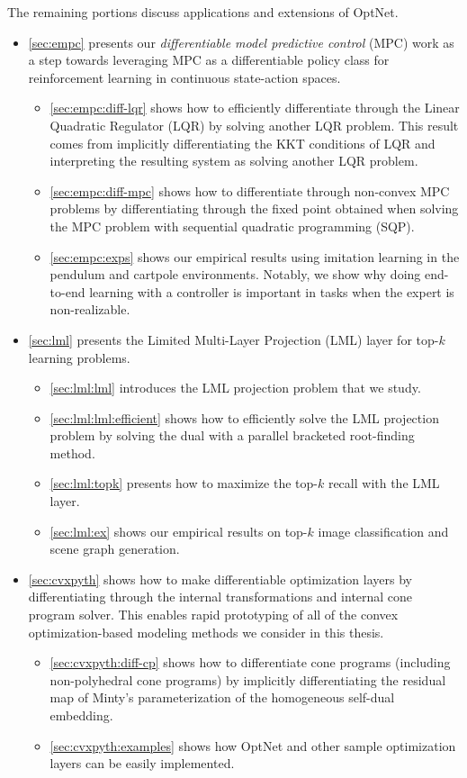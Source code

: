 \vspace{4mm}
The remaining portions discuss applications and
extensions of OptNet.
\begin{itemize}
\item \cref{sec:empc} presents our
  \emph{differentiable model predictive control} (MPC) work
  as a step towards leveraging MPC as a differentiable
  policy class for reinforcement learning in continuous
  state-action spaces.
  \begin{itemize}
  \item \cref{sec:empc:diff-lqr} shows how to efficiently
    differentiate through the Linear Quadratic Regulator (LQR)
    by solving another LQR problem.
    This result comes from implicitly differentiating the KKT
    conditions of LQR and interpreting the resulting system
    as solving another LQR problem.
  \item \cref{sec:empc:diff-mpc} shows how to differentiate
    through non-convex MPC problems by differentiating through the
    fixed point obtained when solving the MPC problem with
    sequential quadratic programming (SQP).
  \item \cref{sec:empc:exps} shows our empirical results
    using imitation learning in the pendulum and cartpole
    environments.
    Notably, we show why doing end-to-end learning with
    a controller is important in tasks when the expert
    is non-realizable.
  \end{itemize}
  \newpage
\item \cref{sec:lml} presents the Limited Multi-Layer Projection
  (LML) layer for top-$k$ learning problems.
  \begin{itemize}
  \item \cref{sec:lml:lml} introduces the LML projection problem
    that we study.
  \item \cref{sec:lml:lml:efficient} shows how to efficiently
    solve the LML projection problem by solving the dual
    with a parallel bracketed root-finding method.
  \item \cref{sec:lml:topk} presents how to maximize
    the top-$k$ recall with the LML layer.
  \item \cref{sec:lml:ex} shows our empirical results on
    top-$k$ image classification and scene graph generation.
  \end{itemize}
\item \cref{sec:cvxpyth} shows how to make differentiable
  \cvxpy optimization layers by differentiating through
  the internal transformations and internal cone program solver.
  This enables rapid prototyping of all of the convex
  optimization-based modeling methods we consider in this thesis.
  \begin{itemize}
  \item \cref{sec:cvxpyth:diff-cp} shows how to differentiate
    cone programs (including non-polyhedral cone programs)
    by implicitly differentiating the residual map of
    Minty's parameterization of the homogeneous
    self-dual embedding.
  \item \cref{sec:cvxpyth:examples} shows how OptNet and
    other sample optimization layers can be easily implemented.
  \end{itemize}
\end{itemize}

